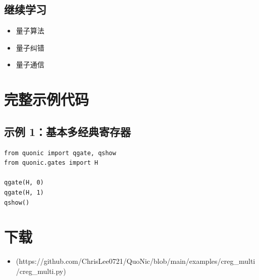 \documentclass[12pt,a4paper]{article}
\begin{document}
\subsection{继续学习}
\begin{itemize}
  \item 量子算法
  \item 量子纠错
  \item 量子通信
\end{itemize}

\section{完整示例代码}

\subsection{示例 1：基本多经典寄存器}

\begin{verbatim}
from quonic import qgate, qshow
from quonic.gates import H

qgate(H, 0)
qgate(H, 1)
qshow()
\end{verbatim}

\section{下载}

\begin{itemize}
  \item [creg\_multi.py](https://github.com/ChrisLee0721/QuoNic/blob/main/examples/creg_multi/creg_multi.py)
\end{itemize}
\end{document}

